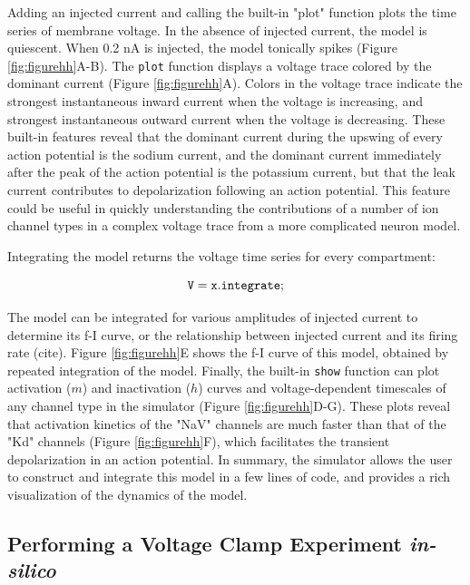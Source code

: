 \documentclass{frontiersSCNS} %
\begin{document}
Adding an injected current and calling the built-in "plot" function plots the time series of membrane voltage. In the absence of injected current, the model is quiescent. When 0.2 nA is injected, the model tonically spikes (Figure \ref{fig:figurehh}A-B).  The \texttt{plot} function displays a voltage trace colored by the dominant current (Figure \ref{fig:figurehh}A). Colors in the voltage trace indicate the strongest instantaneous inward current when the voltage is increasing, and strongest instantaneous outward current when the voltage is decreasing. These built-in features reveal that the dominant current during the upswing of every action potential is the sodium current, and the dominant current immediately after the peak of the action potential is the potassium current, but that the leak current contributes to depolarization following an action potential. This feature could be useful in quickly understanding the contributions of a number of ion channel types in a complex voltage trace from a more complicated neuron model. 

Integrating the model returns the voltage time series for every compartment: 

\begin{equation}
{\tt V = x.integrate;}
\end{equation}

The model can be integrated for various amplitudes of injected current to determine its f-I curve, or the relationship between injected current and its firing rate (cite). Figure \ref{fig:figurehh}E shows the f-I curve of this model, obtained by repeated integration of the model.  Finally, the built-in \texttt{show} function can plot activation ($m$) and inactivation ($h$) curves and voltage-dependent timescales of any channel type in the simulator (Figure \ref{fig:figurehh}D-G). These plots reveal that activation kinetics of the "NaV" channels are much faster than that of the "Kd" channels (Figure \ref{fig:figurehh}F), which facilitates the transient depolarization in an action potential. In summary, the simulator allows the user to construct and integrate this model in a few lines of code, and provides a rich visualization of the dynamics of the model. 


%
%
%
%
%
%




\subsection{Performing a Voltage Clamp Experiment \textit{in-silico}}
\end{document}
